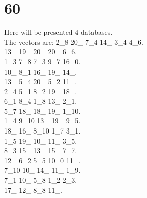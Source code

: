 \chapter{60}
\indent Here will be presented 4 databases.\\
The vectors are:
2\_8 20\_ 7\_4 14\_ 3\_4 4\_6.\\13\_ 19\_ 20\_ 20\_ 6\_6.\\1\_3 7\_8 7\_3 9\_7 16\_0.\\10\_ 8\_1 16\_ 19\_ 14\_.\\13\_ 5\_4 20\_ 5\_2 11\_.\\2\_4 5\_1 8\_2 19\_ 18\_.\\6\_1 8\_4 1\_8 13\_ 2\_1.\\5\_7 18\_ 18\_ 19\_ 1\_10.\\1\_4 9\_10 13\_ 19\_ 9\_5.\\18\_ 16\_ 8\_10 1\_7 3\_1.\\1\_5 19\_ 10\_ 11\_ 3\_5.\\8\_3 15\_ 13\_ 15\_ 7\_7.\\12\_ 6\_2 5\_5 10\_0 11\_.\\7\_10 10\_ 14\_ 11\_ 1\_9.\\7\_1 10\_ 5\_8 1\_2 2\_3.\\17\_ 12\_ 8\_8 11\_.\\